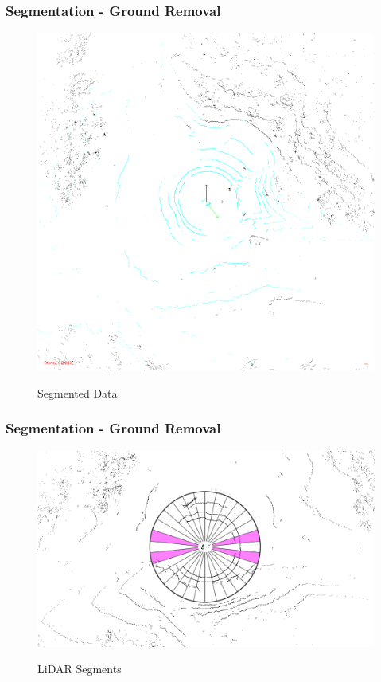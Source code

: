 \documentclass[nosymbols]{beamer}	%
\begin{document}
\begin{frame}
\frametitle{Segmentation - Ground Removal}
\begin{figure}[!ht]
\caption{Segmented Data}
\includegraphics[width=\textwidth,height=0.7\textheight,keepaspectratio]{bilder/Segmentation/img100084.png}
\label{segments}
\end{figure}
\end{frame}


\begin{frame}
\frametitle{Segmentation - Ground Removal}
\begin{figure}[!ht]
\caption{LiDAR Segments}
\includegraphics[width=\textwidth,height=0.7\textheight,keepaspectratio]{bilder/segments.png}
\label{segments}
\end{figure}
\end{frame}
\end{document}
